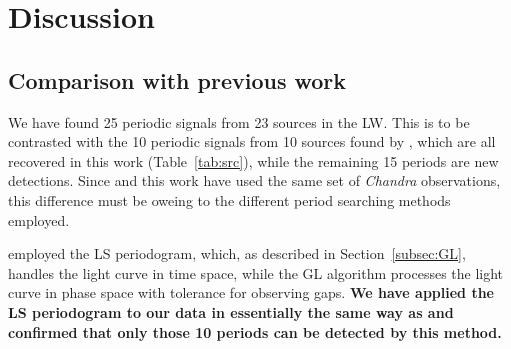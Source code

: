 \documentclass[twoside,twocolumn]{aastex63}
\begin{document}



\section{Discussion}\label{sec:discussion}
\subsection{Comparison with previous work} \label{subsec:compare}
We have found 25 periodic signals from 23 sources in the LW. This is to be contrasted with the 10 periodic signals from 10 sources found by  \cite{2012ApJ...746..165H}, which are all recovered in this work (Table~\ref{tab:src}), while the remaining 15 periods are new detections. 
Since \cite{2012ApJ...746..165H} and this work have used the same set of {\it Chandra} observations, 
this difference must be oweing to the different period searching methods employed.

\cite{2012ApJ...746..165H} employed the LS periodogram,
which, as described in Section~\ref{subsec:GL}, handles the light curve in time space, while the GL algorithm processes the light curve in phase space with tolerance for observing gaps. {\bf We have applied the LS periodogram to our data in essentially the same way as \cite{2012ApJ...746..165H} and confirmed that only those 10 periods can be detected by this method.}
\end{document}
